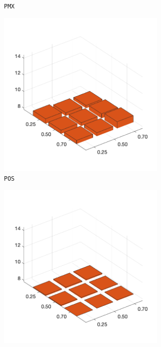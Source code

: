 \begin{figure}[H]
\begin{subfigure}[b]{0.25\textwidth}
		\caption{\texttt{PMX}}
		\label{fig:z}
    	\end{subfigure}
%
	\begin{subfigure}[b]{0.25\textwidth}
		\centering
		\includegraphics[width=0.9\textwidth]{crossover/min/cross_position_based_2.png}
		\caption{\texttt{POS}}
		\label{fig:x}
    	\end{subfigure}
%
	\begin{subfigure}[b]{0.25\textwidth}
		\centering
		\includegraphics[width=0.9\textwidth]{crossover/min/cross_seq_constructive_2.png}

\end{subfigure}
\end{figure}
